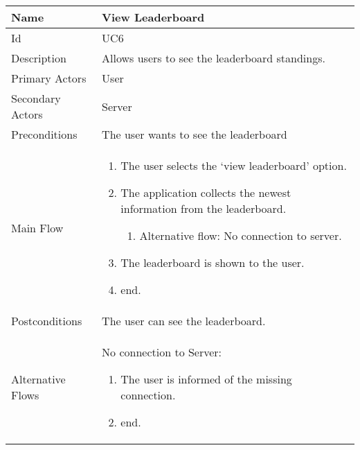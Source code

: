 \begin{tabularx}{\textwidth}{|l|X|}
\hline
Name              & View Leaderboard \\ \hline 
Id                & UC6 \\ \hline
Description       & Allows users to see the leaderboard standings. \\ \hline
Primary Actors    & User \\ \hline
Secondary Actors  & Server \\ \hline
Preconditions     & The user wants to see the leaderboard \\ \hline
Main Flow         &
{\footnotesize \begin{enumerate}
\item The user selects the ‘view leaderboard’ option.
\item The application collects the newest information from the leaderboard.
\begin{enumerate}
\item Alternative flow: No connection to server.
\end{enumerate}
\item The leaderboard is shown to the user.
\item end.
\end{enumerate}} \\ \hline
Postconditions    & The user can see the leaderboard. \\ \hline
Alternative Flows & 
No connection to Server:
{\footnotesize \begin{enumerate}
\item The user is informed of the missing connection.
\item end.
\end{enumerate}}
\\ \hline
\end{tabularx}

